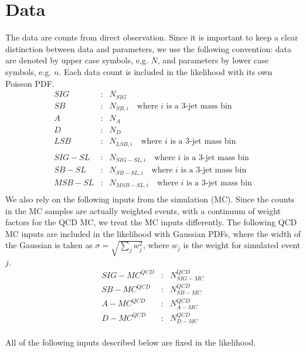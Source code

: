 \documentclass[11pt]{article}
\begin{document}
    \section{Data}
    The data are counts from direct observation.
    Since it is important to keep a clear distinction between data and parameters,
    we use the following convention: data are denoted by upper case symbols, e.g.
    $N$, and parameters by lower case symbols, e.g. $n$.  
    Each data count is included in the likelihood with its own Poisson PDF.
    \begin{eqnarray*}
    SIG & : & N_{SIG} \\
    SB & : & N_{SB,i} \quad \textrm {where $i$ is a 3-jet mass bin} \\ 
    A & : & N_A \\
    D & : & N_D \\ 
    LSB & : & N_{LSB,i} \quad \textrm {where $i$ is a 3-jet mass bin} \\ \\
    SIG-SL & : & N_{SIG-SL,i} \quad \textrm {where $i$ is a 3-jet mass bin} \\
    SB-SL & : & N_{SB-SL,i} \quad \textrm {where $i$ is a 3-jet mass bin} \\
    MSB-SL & : & N_{MSB-SL,i} \quad \textrm {where $i$ is a 3-jet mass bin} \\
    \end{eqnarray*}
    We also rely on the following inputs from the simulation (MC).
    Since the counts in the MC samples are actually weighted events,
    with a continuum of weight factors for the QCD MC, we treat the MC
    inputs differently.
    The following QCD MC inputs are included in the likelihood with
    Gaussian PDFs, where the width of the Gaussian is taken as  $\sigma = \sqrt{\sum_j w_j^2}$,
    where $w_j$ is the weight for simulated event $j$.
    \begin{eqnarray*}
    SIG-MC^{QCD} & : & N_{SIG-MC}^{QCD} \\
    SB-MC^{QCD} & : & N_{SB-MC}^{QCD} \\
    A-MC^{QCD} & : & N_{A-MC}^{QCD} \\
    D-MC^{QCD} & : & N_{D-MC}^{QCD} \\ 
    \end{eqnarray*}



    \noindent
    All of the following inputs described below are fixed in the likelihood. \\
\end{document}
